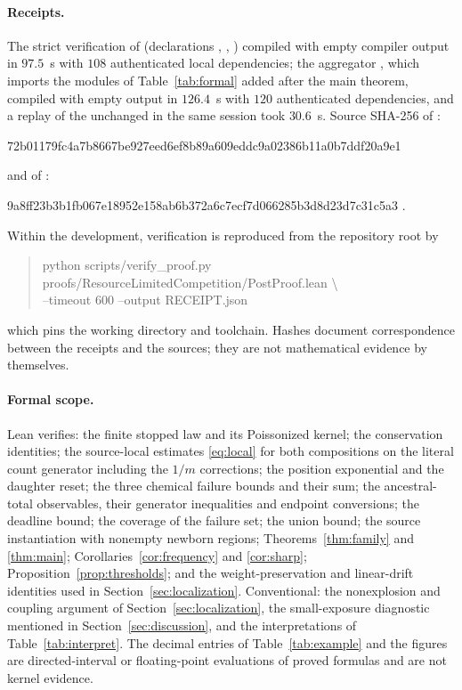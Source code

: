 \documentclass[11pt,a4paper]{article}
\theoremstyle{plain}
\theoremstyle{definition}
\theoremstyle{remark}
\begin{document}
\paragraph{Receipts.}
The strict verification of  (declarations , , ) compiled with empty compiler output in $97.5$~s with $108$ authenticated local dependencies; the aggregator , which imports the modules of Table~\ref{tab:formal} added after the main theorem, compiled with empty output in $126.4$~s with $120$ authenticated dependencies, and a replay of the unchanged  in the same session took $30.6$~s. Source SHA-256 of :
\begin{center}\footnotesize\ttfamily
72b01179fc4a7b8667be927eed6ef8b89a609eddc9a02386b11a0b7ddf20a9e1
\end{center}
and of :
\begin{center}\footnotesize\ttfamily
9a8ff23b3b1fb067e18952e158ab6b372a6c7ecf7d066285b3d8d23d7c31c5a3 .
\end{center}
Within the development, verification is reproduced from the repository root by
\begin{quote}\footnotesize\ttfamily
python scripts/verify\_proof.py proofs/ResourceLimitedCompetition/PostProof.lean \textbackslash\\
\hspace*{2em}--timeout 600 --output RECEIPT.json
\end{quote}
which pins the working directory and toolchain. Hashes document correspondence between the receipts and the sources; they are not mathematical evidence by themselves.

\paragraph{Formal scope.}
Lean verifies: the finite stopped law and its Poissonized kernel; the conservation identities; the source-local estimates \eqref{eq:local} for both compositions on the literal count generator including the $1/m$ corrections; the position exponential and the daughter reset; the three chemical failure bounds and their sum; the ancestral-total observables, their generator inequalities and endpoint conversions; the deadline bound; the coverage of the failure set; the union bound; the source instantiation with nonempty newborn regions; Theorems~\ref{thm:family} and \ref{thm:main}; Corollaries~\ref{cor:frequency} and \ref{cor:sharp}; Proposition~\ref{prop:thresholds}; and the weight-preservation and linear-drift identities used in Section~\ref{sec:localization}. Conventional: the nonexplosion and coupling argument of Section~\ref{sec:localization}, the small-exposure diagnostic mentioned in Section~\ref{sec:discussion}, and the interpretations of Table~\ref{tab:interpret}. The decimal entries of Table~\ref{tab:example} and the figures are directed-interval or floating-point evaluations of proved formulas and are not kernel evidence.



\end{document}
